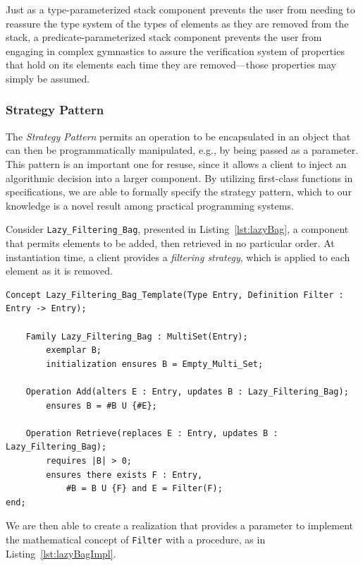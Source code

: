 Just as a type-parameterized stack component prevents the user from needing to reassure the type system of the types of elements as they are removed from the stack, a predicate-parameterized stack component prevents the user from engaging in complex gymnastics to assure the verification system of properties that hold on its elements each time they are removed---those properties may simply be assumed. 

		\subsubsection{Strategy Pattern\label{strategyPattern}}

The \emph{Strategy Pattern} permits an operation to be encapsulated in an object that can then be programmatically manipulated, e.g., by being passed as a parameter.  This pattern is an important one for resuse, since it allows a client to inject an algorithmic decision into a larger component.  By utilizing first-class functions in specifications, we are able to formally specify the strategy pattern, which to our knowledge is a novel result among practical programming systems.

Consider \texttt{Lazy\_Filtering\_Bag}, presented in Listing~\ref{lst:lazyBag}, a component that permits elements to be added, then retrieved in no particular order.   At instantiation time, a client provides a \emph{filtering strategy}, which is applied to each element as it is removed.

\begin{lstlisting}[float=h,language=resolve,caption={A specification for \texttt{Lazy\_Filtering\_Bag}\label{lst:lazyBag}}]
Concept Lazy_Filtering_Bag_Template(Type Entry, Definition Filter : Entry -> Entry);
	
	Family Lazy_Filtering_Bag : MultiSet(Entry);
		exemplar B;
		initialization ensures B = Empty_Multi_Set;

	Operation Add(alters E : Entry, updates B : Lazy_Filtering_Bag);
		ensures B = #B U {#E};

	Operation Retrieve(replaces E : Entry, updates B : Lazy_Filtering_Bag);
		requires |B| > 0;
		ensures there exists F : Entry,
			#B = B U {F} and E = Filter(F);
end;
\end{lstlisting}

We are then able to create a realization that provides a parameter to implement the mathematical concept of \texttt{Filter} with a procedure, as in Listing~\ref{lst:lazyBagImpl}.

